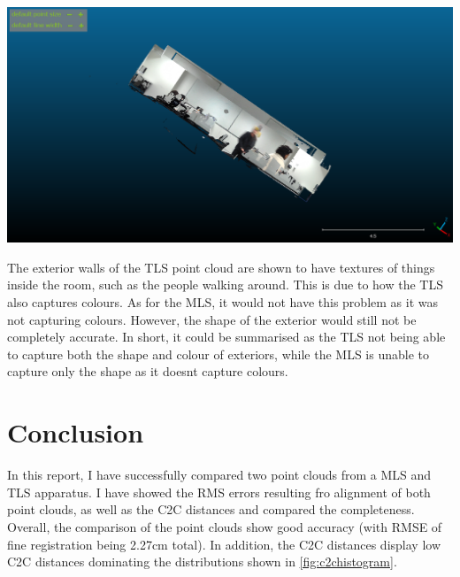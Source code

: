 \documentclass[man]{apa7}
\begin{document}
\begin{minipage}{\linewidth}
  \includegraphics[height=\textheight/4 ,width=\textwidth/2]{figures/exteriorTLS.png}
  \label{fig:exteriorArea}
\end{minipage}

The exterior walls of the TLS point cloud are shown to have textures of things inside the room, such as the people walking around. This is due to how the TLS also captures colours. As for the MLS, it would not have this problem as it was not capturing colours. However, the shape of the exterior would still not be completely accurate. In short, it could be summarised as the TLS not being able to capture both the shape and colour of exteriors, while the MLS is unable to capture only the shape as it doesnt capture colours.

\newpage

\section{Conclusion}

In this report, I have successfully compared two point clouds from a MLS and TLS apparatus. I have showed the RMS errors resulting fro alignment of both point clouds, as well as the C2C distances and compared the completeness. Overall, the comparison of the point clouds show good accuracy (with RMSE of fine registration being 2.27cm total). In addition, the C2C distances display low C2C distances dominating the distributions shown in \ref{fig:c2chistogram}. 
\end{document}
